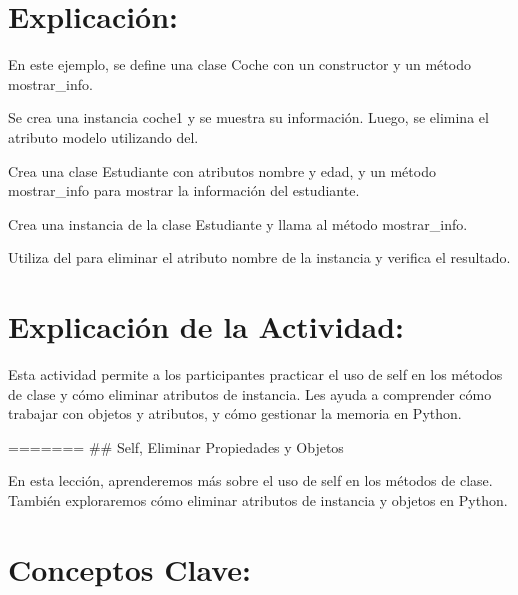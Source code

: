 \documentclass[
  a4paper,
  DIV=11,
  numbers=noendperiod,
  onepage,
  openany]{scrreprt}
\begin{document}
\hypertarget{explicaciuxf3n-54}{%
\section{Explicación:}\label{explicaciuxf3n-54}}

En este ejemplo, se define una clase Coche con un constructor y un
método mostrar\_info.

Se crea una instancia coche1 y se muestra su información. Luego, se
elimina el atributo modelo utilizando del.

\begin{tcolorbox}[enhanced jigsaw, colbacktitle=quarto-callout-important-color!10!white, toprule=.15mm, leftrule=.75mm, titlerule=0mm, opacityback=0, rightrule=.15mm, opacitybacktitle=0.6, breakable, left=2mm, coltitle=black, title=\textcolor{quarto-callout-important-color}{\faExclamation}\hspace{0.5em}{Actividad Práctica:}, toptitle=1mm, bottomtitle=1mm, arc=.35mm, bottomrule=.15mm, colback=white, colframe=quarto-callout-important-color-frame]

Crea una clase Estudiante con atributos nombre y edad, y un método
mostrar\_info para mostrar la información del estudiante.

Crea una instancia de la clase Estudiante y llama al método
mostrar\_info.

Utiliza del para eliminar el atributo nombre de la instancia y verifica
el resultado.

\end{tcolorbox}

\hypertarget{explicaciuxf3n-de-la-actividad-52}{%
\section{Explicación de la
Actividad:}\label{explicaciuxf3n-de-la-actividad-52}}

Esta actividad permite a los participantes practicar el uso de self en
los métodos de clase y cómo eliminar atributos de instancia. Les ayuda a
comprender cómo trabajar con objetos y atributos, y cómo gestionar la
memoria en Python.

======= \#\# Self, Eliminar Propiedades y Objetos

En esta lección, aprenderemos más sobre el uso de self en los métodos de
clase. También exploraremos cómo eliminar atributos de instancia y
objetos en Python.

\hypertarget{conceptos-clave-55}{%
\section{Conceptos Clave:}\label{conceptos-clave-55}}
\end{document}
